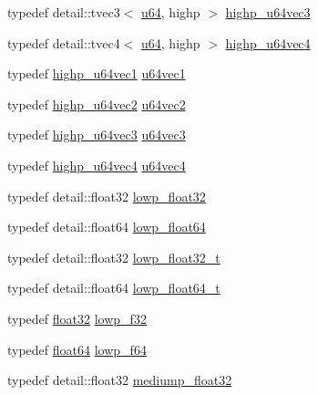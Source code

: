 \begin{CompactItemize}
\item 
typedef detail::tvec3$<$ \hyperlink{group__gtc__type__precision_g71cedd4972f9cb1a5e14dfe5ab83ecd7}{u64}, highp $>$ \hyperlink{group__gtc__type__precision_g3cb5c038f8cba0dfb894af66b7b2ba13}{highp\_\-u64vec3}
\item 
typedef detail::tvec4$<$ \hyperlink{group__gtc__type__precision_g71cedd4972f9cb1a5e14dfe5ab83ecd7}{u64}, highp $>$ \hyperlink{group__gtc__type__precision_g8aa6fc9f16dfa3078d411f6361188a45}{highp\_\-u64vec4}
\item 
typedef \hyperlink{group__gtc__type__precision_gb48ca217e1d1cc9aac3d9f037493ae7e}{highp\_\-u64vec1} \hyperlink{group__gtc__type__precision_g7d5145019ad749f4becd39ce8e786a5f}{u64vec1}
\item 
typedef \hyperlink{group__gtc__type__precision_gd11667a4764867732a89791ec2a01aeb}{highp\_\-u64vec2} \hyperlink{group__gtc__type__precision_gffa78d655fd98b33e47043e2bd38641b}{u64vec2}
\item 
typedef \hyperlink{group__gtc__type__precision_g3cb5c038f8cba0dfb894af66b7b2ba13}{highp\_\-u64vec3} \hyperlink{group__gtc__type__precision_ge934e74663d832989066cc852560866d}{u64vec3}
\item 
typedef \hyperlink{group__gtc__type__precision_g8aa6fc9f16dfa3078d411f6361188a45}{highp\_\-u64vec4} \hyperlink{group__gtc__type__precision_g59d78a1ff6d275bbb425dce92f607b9c}{u64vec4}
\item 
typedef detail::float32 \hyperlink{group__gtc__type__precision_g92be8087f3c84504f3a44af1a9efc51e}{lowp\_\-float32}
\item 
typedef detail::float64 \hyperlink{group__gtc__type__precision_g32e02689f4e83fb269c9047418536f2c}{lowp\_\-float64}
\item 
typedef detail::float32 \hyperlink{group__gtc__type__precision_gdfb453b23cb820e3e4e766e047c67dab}{lowp\_\-float32\_\-t}
\item 
typedef detail::float64 \hyperlink{group__gtc__type__precision_gc9d64f4e69d6c2eade41a848077866b5}{lowp\_\-float64\_\-t}
\item 
typedef \hyperlink{group__gtc__type__precision_g814f2f65354b6588b067cc5c67a6b340}{float32} \hyperlink{group__gtc__type__precision_g1b9734de4b4429dc26b1454a2a399b05}{lowp\_\-f32}
\item 
typedef \hyperlink{group__gtc__type__precision_gb721f828b41f46b20cf4883b50733d3b}{float64} \hyperlink{group__gtc__type__precision_g59839f4bf6b97c93b0def577890bbfb8}{lowp\_\-f64}
\item 
typedef detail::float32 \hyperlink{group__gtc__type__precision_g1b5f74cbeed0c9d42cd57d77609be7ee}{mediump\_\-float32}

\end{CompactItemize}
